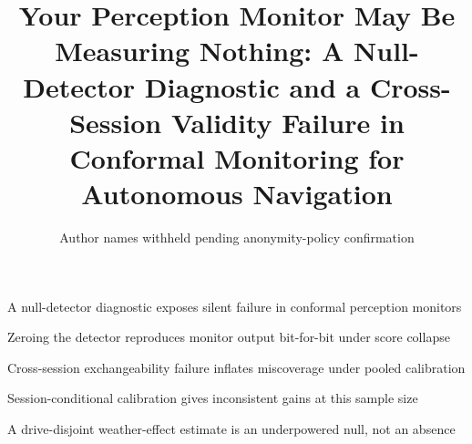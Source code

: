 \documentclass[review]{elsarticle}
\begin{document}
\begin{frontmatter}

\title{Your Perception Monitor May Be Measuring Nothing: A Null-Detector Diagnostic and a Cross-Session Validity Failure in Conformal Monitoring for Autonomous Navigation}

\author{Author names withheld pending anonymity-policy confirmation}
\address{Affiliation withheld pending anonymity-policy confirmation}

\begin{highlights}
\item A null-detector diagnostic exposes silent failure in conformal perception monitors
\item Zeroing the detector reproduces monitor output bit-for-bit under score collapse
\item Cross-session exchangeability failure inflates miscoverage under pooled calibration
\item Session-conditional calibration gives inconsistent gains at this sample size
\item A drive-disjoint weather-effect estimate is an underpowered null, not an absence
\end{highlights}


\end{frontmatter}
\end{document}
